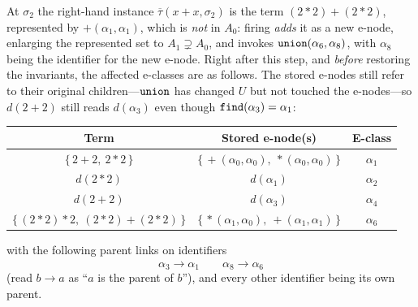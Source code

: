 \begin{example}
At $\sigma_2$ the right-hand instance
$\overline{\tau}(x+x, \sigma_2)$ is the term $(2\ast2)+(2\ast2)$, represented by $+(\alpha_1, \alpha_1)$, which is \emph{not} in
$A_0$: firing \emph{adds} it as a new e-node, enlarging the represented set to
$A_1 \supsetneq A_0$, and invokes $\texttt{union}(\alpha_6, \alpha_8)$, with $\alpha_8$ being the identifier for the new e-node.
Right after this step, and \emph{before} restoring the invariants, the affected
e-classes are as follows. The stored e-nodes still refer to their
original children---$\texttt{union}$ has changed $U$ but not touched the
e-nodes---so $d(2{+}2)$ still reads $d(\alpha_3)$ even though
$\texttt{find}(\alpha_3) = \alpha_1$:
\begin{center}
\begin{tabular}{c|c|c}
  Term & Stored e-node(s) & E-class\\
  \hline
  $\{\,2{+}2,\ 2{\ast}2\,\}$ & $\{\,{+}(\alpha_0, \alpha_0),\ {\ast}(\alpha_0, \alpha_0)\,\}$ & $\alpha_1$\\
  $d(2{\ast}2)$ & $d(\alpha_1)$ & $\alpha_2$\\
  $d(2{+}2)$ & $d(\alpha_3)$ & $\alpha_4$\\
  $\{\,(2{\ast}2){\ast}2,\ (2{\ast}2){+}(2{\ast}2)\,\}$ & $\{\,{\ast}(\alpha_1, \alpha_0),\ {+}(\alpha_1, \alpha_1)\,\}$ & $\alpha_6$\\
\end{tabular}
\end{center}
with the following parent links on identifiers
\[
\alpha_3 \xrightarrow{} \alpha_1 \qquad \alpha_8 \xrightarrow{} \alpha_6
\]
(read $b \to a$ as ``$a$ is the parent of $b$''), and every other
identifier being its own parent.

\end{example}

